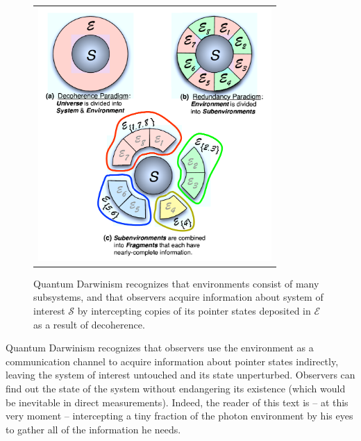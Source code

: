 \documentclass[aps,amsmath,amssymb,amsfonts,floatfix]{revtex4-1}
\newcommand{\cS}        {{\mathcal S}}
\newcommand{\cE}        {{\mathcal E}}
\newcommand{\+}         {\dagger}
\newcommand\hocom[1]{}%
\begin{document}
{\hocom{Monitoring of the system by the environment (the process responsible for
decoherence) will typically leave behind multiple copies of its pointer states in $\cE$. Pointer states are favored -- only states that can survive decoherence can produce information theoretic progeny in this manner \cite{42,43}. Therefore, only information about
pointer states can be recorded redundantly. States that can survive decoherence
can use the same interactions that are responsible for einselection to proliferate information about
themselves throughout the environment.}

{\begin{figure}[tb]
\begin{tabular}{l}
\vspace{-0.15in} 
\includegraphics[width=3.5in]{EnvSubdivision.pdf}\\
\end{tabular}
\caption{Quantum Darwinism recognizes that environments consist of many subsystems, and that observers acquire information about system of interest $\cS$ by intercepting copies of its pointer states deposited in $\cE$ as a result of decoherence.
}
\label{EnvSubdivision}
\end{figure}

Quantum Darwinism \cite{75,Z00} recognizes that observers use the environment as
a communication channel to acquire information about pointer states indirectly, leaving the system of interest untouched
and its state unperturbed. Observers can
find out the state of the system without endangering its existence (which would be inevitable in direct measurements). Indeed, the reader of this text is -- at this very moment -- intercepting
a tiny fraction of the photon environment by his eyes to gather all of the information he needs. 

}}
\end{document}
